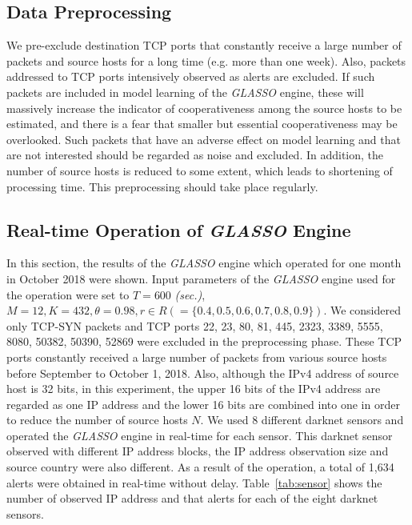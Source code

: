 \documentclass[conference]{IEEEtran}
\begin{document}
\subsection{Data Preprocessing}
We pre-exclude destination TCP ports that constantly receive a large number of packets and source hosts for a long time (e.g. more than one week).
Also, packets addressed to TCP ports intensively observed as alerts are excluded.
If such packets are included in model learning of the {\it GLASSO} engine, these will massively increase the indicator of cooperativeness among the source hosts to be estimated, and there is a fear that smaller but essential cooperativeness may be overlooked.
Such packets that have an adverse effect on model learning and that are not interested should be regarded as noise and excluded.
In addition, the number of source hosts is reduced to some extent, which leads to shortening of processing time.
This preprocessing should take place regularly.



\subsection{Real-time Operation of {\it GLASSO} Engine}
In this section, the results of the {\it GLASSO} engine which operated for one month in October 2018 were shown.
Input parameters of the {\it GLASSO} engine used for the operation were set to $T=600$ {\it (sec.)}, $M=12, K=432, \theta=0.98, r \in R ( = \{0.4, 0.5, 0.6, 0.7, 0.8, 0.9\})$.
We considered only TCP-SYN packets and TCP ports 22, 23, 80, 81, 445, 2323, 3389, 5555, 8080, 50382, 50390, 52869 were excluded in the preprocessing phase.
These TCP ports constantly received a large number of packets from various source hosts before September to October 1, 2018.
Also, although the IPv4 address of source host is 32 bits, in this experiment, the upper 16 bits of the IPv4 address are regarded as one IP address and the lower 16 bits are combined into one in order to reduce the number of source hosts $N$.
We used 8 different darknet sensors and operated the {\it GLASSO} engine in real-time for each sensor.
This darknet sensor observed with different IP address blocks, the IP address observation size and source country were also different.
As a result of the operation, a total of 1,634 alerts were obtained in real-time without delay.
Table~\ref{tab:sensor} shows the number of observed IP address and that alerts for each of the eight darknet sensors.
\end{document}
